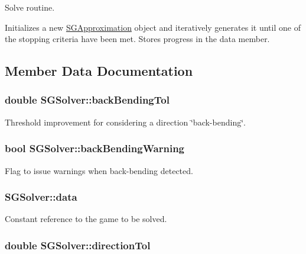 Solve routine. 

Initializes a new \hyperlink{class_s_g_approximation}{S\+G\+Approximation} object and iteratively generates it until one of the stopping criteria have been met. Stores progress in the data member. 

\subsection{Member Data Documentation}
\hypertarget{class_s_g_solver_a58acc9239deaff33ccfa2f3956466f37}{
\subsubsection[{back\+Bending\+Tol}]{\setlength{\rightskip}{0pt plus 5cm}double S\+G\+Solver\+::back\+Bending\+Tol\hspace{0.3cm}{\ttfamily [private]}}}\label{class_s_g_solver_a58acc9239deaff33ccfa2f3956466f37}
Threshold improvement for considering a direction \char`\"{}back-\/bending\char`\"{}. \hypertarget{class_s_g_solver_a55e60a2b64baf525b826a4cff816f653}{
\subsubsection[{back\+Bending\+Warning}]{\setlength{\rightskip}{0pt plus 5cm}bool S\+G\+Solver\+::back\+Bending\+Warning\hspace{0.3cm}{\ttfamily [private]}}}\label{class_s_g_solver_a55e60a2b64baf525b826a4cff816f653}
Flag to issue warnings when back-\/bending detected. \hypertarget{class_s_g_solver_a83e1c54773913a937f44d55772f2e69f}{
\subsubsection[{data}]{ S\+G\+Solver\+::data\hspace{0.3cm}{\ttfamily [private]}}}\label{class_s_g_solver_a83e1c54773913a937f44d55772f2e69f}
Constant reference to the game to be solved. \hypertarget{class_s_g_solver_a2bd9962c5c18abb454ca1650465abefb}{
\subsubsection[{direction\+Tol}]{\setlength{\rightskip}{0pt plus 5cm}double S\+G\+Solver\+::direction\+Tol\hspace{0.3cm}{\ttfamily [private]}}}\label{class_s_g_solver_a2bd9962c5c18abb454ca1650465abefb}
